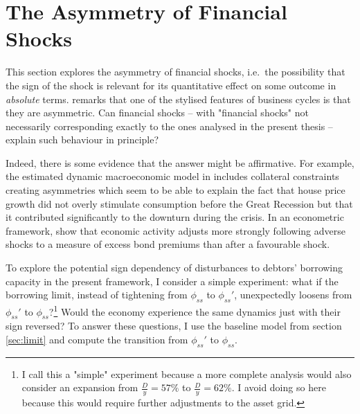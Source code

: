 \documentclass[a4paper,12pt]{article} %
\numberwithin{equation}{section} %
\numberwithin{figure}{section}
\numberwithin{table}{section}
\begin{document}
\section{The Asymmetry of Financial Shocks}
\label{sec:asymmetry}

This section explores the asymmetry of financial shocks, i.e.~the possibility that the sign of the
shock is relevant for its quantitative effect on some outcome in \textit{absolute} terms. \textcite{kocherlakota2000} remarks that one of the stylised features of business cycles is that they are asymmetric. Can financial shocks -- with "financial shocks" not necessarily corresponding exactly to the ones analysed in the present thesis -- explain such behaviour in principle?  %

Indeed, there is some evidence that the answer might be affirmative. For example, the estimated dynamic macroeconomic model in \textcite{guerrieri2017asym} includes collateral constraints creating asymmetries which seem to be able to explain the fact that house price growth did not overly stimulate consumption before the Great Recession but that it contributed significantly to the downturn during the crisis. In an econometric framework, \textcite{barnichon2022} show that economic activity adjusts more strongly following adverse shocks to a measure of excess bond premiums than after a favourable shock.

To explore the potential sign dependency of disturbances to debtors' borrowing capacity in the present framework, I consider a simple experiment: what if the borrowing limit, instead of tightening from $\phi_{ss}$ to $\phi_{ss}'$, unexpectedly loosens from $\phi_{ss}'$ to $\phi_{ss}$?\footnote{I call this a "simple" experiment because a more complete analysis would also consider an expansion from $\frac{D}{y} = 57\%$ to $\frac{D}{y} = 62\%$. I avoid doing so here because this would require further adjustments to the asset grid.} Would the economy experience the same dynamics just with their sign reversed? To answer these questions, I use the baseline model from section \ref{sec:limit} and compute the transition from $\phi_{ss}'$ to $\phi_{ss}$. %
\end{document}
